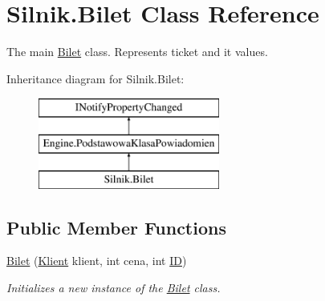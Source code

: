 \hypertarget{class_silnik_1_1_bilet}{}\section{Silnik.\+Bilet Class Reference}
\label{class_silnik_1_1_bilet}


The main \mbox{\hyperlink{class_silnik_1_1_bilet}{Bilet}} class. Represents ticket and it values.  


Inheritance diagram for Silnik.\+Bilet\+:\begin{figure}[H]
\begin{center}
\leavevmode
\includegraphics[height=3.000000cm]{class_silnik_1_1_bilet}
\end{center}
\end{figure}
\subsection*{Public Member Functions}
\begin{DoxyCompactItemize}
\item 
\mbox{\hyperlink{class_silnik_1_1_bilet_ab746139c19ca9a3ba4214e2edcca628a}{Bilet}} (\mbox{\hyperlink{class_silnik_1_1_klient}{Klient}} klient, int cena, int \mbox{\hyperlink{class_silnik_1_1_bilet_a44f01e9fea5fc9d9942a901df1854f61}{ID}})
\begin{DoxyCompactList}\small\item\em Initializes a new instance of the \mbox{\hyperlink{class_silnik_1_1_bilet}{Bilet}} class.\end{DoxyCompactList}\end{DoxyCompactItemize}
